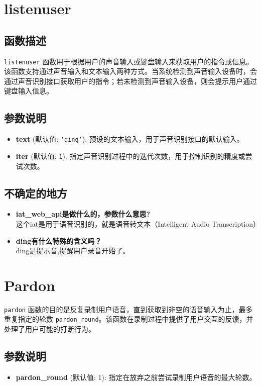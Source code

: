 \documentclass[]{article}
\begin{document}
	\section{listenuser}
	\subsection{函数描述}
	
	\texttt{listenuser} 函数用于根据用户的声音输入或键盘输入来获取用户的指令或信息。该函数支持通过声音输入和文本输入两种方式。当系统检测到声音输入设备时，会通过声音识别接口获取用户的指令；若未检测到声音输入设备，则会提示用户通过键盘输入信息。
	\subsection{参数说明}
	\begin{itemize}
		\item \textbf{text} (默认值: \texttt{'ding'}): 预设的文本输入，用于声音识别接口的默认输入。
		\item \textbf{iter} (默认值: \texttt{1}): 指定声音识别过程中的迭代次数，用于控制识别的精度或尝试次数。
	\end{itemize}
	\subsection{不确定的地方}
\begin{itemize}
	\item \textbf{ iat\_web\_api是做什么的，参数什么意思?}\\
	这个iat是用于语音识别的，就是语音转文本（Intelligent Audio Transcription）
	\item \textbf{ding有什么特殊的含义吗？}\\
	ding是提示音,提醒用户录音开始了。
	
\end{itemize}
\section{Pardon}

\texttt{pardon} 函数的目的是反复录制用户语音，直到获取到非空的语音输入为止，最多重复指定的轮数 \texttt{pardon\_round}。该函数在录制过程中提供了用户交互的反馈，并处理了用户可能的打断行为。

\subsection{参数说明}
\begin{itemize}
	\item \textbf{pardon\_round} (默认值: 1): 指定在放弃之前尝试录制用户语音的最大轮数。
\end{itemize}
\end{document}
